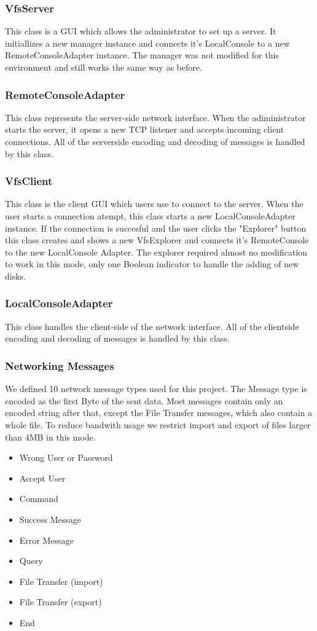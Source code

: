 \documentclass[a4paper,12pt]{article}
\begin{document}
\subsubsection{VfsServer}
This class is a GUI which allows the administrator to set up a server. It initiallizes a new manager instance and connects it's LocalConsole to a new RemoteConsoleAdapter instance. The manager was not modified for this environment and still works the same way as before.
\subsubsection{RemoteConsoleAdapter}
This class represents the server-side network interface. When the adiministrator starts the server, it opens a new TCP listener and accepts incoming client connections. All of the serverside encoding and decoding of messages is handled by this class.
\subsubsection{VfsClient}
This class is the client GUI which users use to connect to the server. When the user starts a connection atempt, this class starts a new LocalConsoleAdapter instance. If the connection is succesful and the user clicks the "Explorer" button this class creates and shows  a new VfsExplorer and connects it's RemoteConsole to the new LocalConsole Adapter. The explorer required almost no modification to work in this mode, only one Boolean indicator to handle the adding of new disks.
\subsubsection{LocalConsoleAdapter}
This class handles the client-side of the network interface. All of the clientside encoding and decoding of messages is handled by this class.

\subsubsection{Networking Messages}
We defined 10 network message types used for this project. The Message type is encoded as the first Byte of the sent data. Most messages contain only an encoded string after that, except the File Transfer messages, which also contain a whole file. To reduce bandwith usage we restrict import and export of files larger than 4MB in this mode.
\begin{itemize}
\item Wrong User or Password
\item Accept User
\item Command
\item Success Message
\item Error Message
\item Query
\item File Transfer (import)
\item File Transfer (export)
\item End
\end{itemize}
\end{document}
